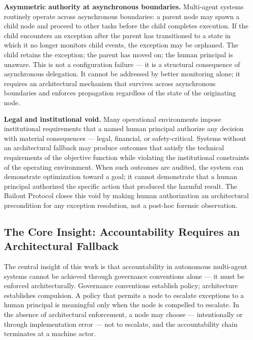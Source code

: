 \textbf{Asymmetric authority at asynchronous boundaries.} Multi-agent systems routinely operate across asynchronous boundaries: a parent node may spawn a child node and proceed to other tasks before the child completes execution. If the child encounters an exception after the parent has transitioned to a state in which it no longer monitors child events, the exception may be orphaned. The child retains the exception; the parent has moved on; the human principal is unaware. This is not a configuration failure — it is a structural consequence of asynchronous delegation. It cannot be addressed by better monitoring alone; it requires an architectural mechanism that survives across asynchronous boundaries and enforces propagation regardless of the state of the originating node.

\textbf{Legal and institutional void.} Many operational environments impose institutional requirements that a named human principal authorize any decision with material consequences — legal, financial, or safety-critical. Systems without an architectural fallback may produce outcomes that satisfy the technical requirements of the objective function while violating the institutional constraints of the operating environment. When such outcomes are audited, the system can demonstrate optimization toward a goal; it cannot demonstrate that a human principal authorized the specific action that produced the harmful result. The Bailout Protocol closes this void by making human authorization an architectural precondition for any exception resolution, not a post-hoc forensic observation.

\subsection{The Core Insight: Accountability Requires an Architectural Fallback}\label{sec:core-insight}

The central insight of this work is that accountability in autonomous multi-agent systems cannot be achieved through governance conventions alone — it must be enforced architecturally. Governance conventions establish policy; architecture establishes compulsion. A policy that permits a node to escalate exceptions to a human principal is meaningful only when the node is compelled to escalate. In the absence of architectural enforcement, a node may choose — intentionally or through implementation error — not to escalate, and the accountability chain terminates at a machine actor.

